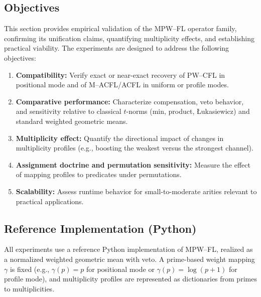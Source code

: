 \documentclass[11pt]{article}
\begin{document}
\subsection{Objectives}
\label{subsec:objectives}

This section provides empirical validation of the MPW--FL operator family, confirming its unification claims, quantifying multiplicity effects, and establishing practical viability. The experiments are designed to address the following objectives:
\begin{enumerate}[label=\textbf{O\arabic*}.]
  \item \textbf{Compatibility:} Verify exact or near-exact recovery of PW--CFL in positional mode and of M--ACFL/ACFL in uniform or profile modes.
  \item \textbf{Comparative performance:} Characterize compensation, veto behavior, and sensitivity relative to classical $t$-norms (min, product, \L{}ukasiewicz) and standard weighted geometric means.
  \item \textbf{Multiplicity effect:} Quantify the directional impact of changes in multiplicity profiles (e.g., boosting the weakest versus the strongest channel).
  \item \textbf{Assignment doctrine and permutation sensitivity:} Measure the effect of mapping profiles to predicates under permutations.
  \item \textbf{Scalability:} Assess runtime behavior for small-to-moderate arities relevant to practical applications.
\end{enumerate}

\subsection{Reference Implementation (Python)}
\label{subsec:ref-impl}

All experiments use a reference Python implementation of MPW--FL, realized as a normalized weighted geometric mean with veto. A prime-based weight mapping $\gamma$ is fixed (e.g., $\gamma(p) = p$ for positional mode or $\gamma(p) = \log(p+1)$ for profile mode), and multiplicity profiles are represented as dictionaries from primes to multiplicities.
\end{document}
